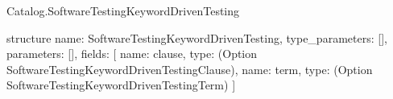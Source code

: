 \begin{lexlean}{Catalog.SoftwareTestingKeywordDrivenTesting}
\begin{semanticmodule}
structure{
  name: SoftwareTestingKeywordDrivenTesting,
  type_parameters: [],
  parameters: [],
  fields: [
    {name: clause, type: (Option SoftwareTestingKeywordDrivenTestingClause)},
    {name: term, type: (Option SoftwareTestingKeywordDrivenTestingTerm)}
  ]
}
\end{semanticmodule}
\end{lexlean}
